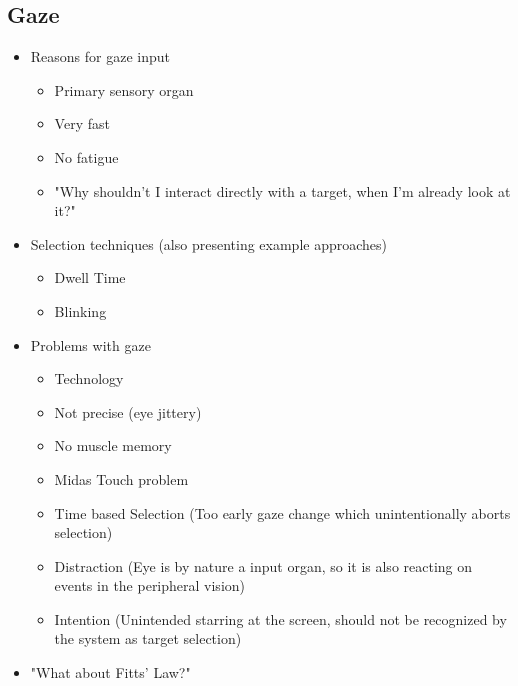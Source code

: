\documentclass{sigchi}
\begin{document}
\subsection{Gaze}
\begin{itemize}
  \item Reasons for gaze input
  \begin{itemize}
    \item Primary sensory organ
    \item Very fast
    \item No fatigue
    \item "Why shouldn't I interact directly with a target, when I'm already look at it?"
  \end{itemize}
  \item Selection techniques (also presenting example approaches)
  \begin{itemize}
    \item Dwell Time
    \item Blinking
  \end{itemize}
  \item Problems with gaze
  \begin{itemize}
    \item Technology
    \item Not precise (eye jittery)
    \item No muscle memory
    \item Midas Touch problem
    \item Time based Selection (Too early gaze change which unintentionally aborts selection)
    \item Distraction (Eye is by nature a input organ, so it is also reacting on events in the peripheral vision)
    \item Intention (Unintended starring at the screen, should not be recognized by the system as target selection)
  \end{itemize}  
  \item "What about Fitts' Law?"
\end{itemize}
\end{document}
